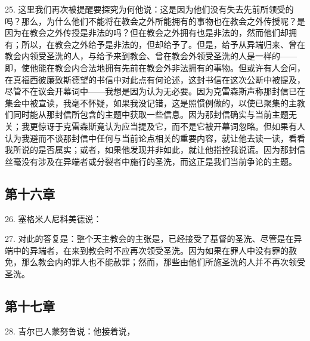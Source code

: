 25. 这里我们再次被提醒要探究为何他说：这是因为他们没有失去先前所领受的吗？那么，为什么他们不能将在教会之外所能拥有的事物也在教会之外传授呢？是因为在教会之外传授是非法的吗？但在教会之外拥有也是非法的，然而他们却拥有；所以，在教会之外给予是非法的，但却给予了。但是，给予从异端归来、曾在教会内领受圣洗的人，与给予来到教会、曾在教会外领受圣洗的人是一样的——即，使他能在教会内合法地拥有先前在教会外非法拥有的事物。但或许有人会问，在真福西彼廉致斯德望的书信中对此点有何论述，这封书信在这次公断中被提及，尽管不在议会开幕词中——我想是因为认为无必要。因为克雷森斯声称那封信已在集会中被宣读，我毫不怀疑，如果我没记错，这是照惯例做的，以使已聚集的主教们同时能从那封信所包含的主题中获取一些信息。因为那封信确实与当前主题无关；我更惊讶于克雷森斯竟认为应当提及它，而不是它被开幕词忽略。但如果有人认为我避而不谈那封信中任何与当前论点相关的重要内容，就让他去读一读，看看我所说的是否属实；或者，如果他发现并非如此，就让他指控我说谎。因为那封信丝毫没有涉及在异端者或分裂者中施行的圣洗，而这正是我们当前争论的主题。\par


\subsection{第十六章}

26. 塞格米人尼科美德说：\par

27. 对此的答复是：整个天主教会的主张是，已经接受了基督的圣洗、尽管是在异端中的异端者，在来到教会时不应再次领受圣洗。因为如果在罪人中没有罪的赦免，那么教会内的罪人也不能赦罪；然而，那些由他们所施圣洗的人并不再次领受圣洗。\par


\subsection{第十七章}

28. 吉尔巴人蒙努鲁说：他接着说，\par

